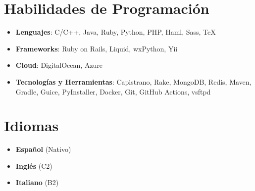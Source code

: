 \documentclass[letterpaper,11pt]{article}
\newcommand{\resumeSubHeadingListStart}{\begin{itemize}[leftmargin=*]}
\newcommand{\resumeSubHeadingListEnd}{\end{itemize}}
\begin{document}
\section{Habilidades de Programación}
  \resumeSubHeadingListStart
    \item{
      \textbf{Lenguajes}{: C/C++, Java, Ruby, Python, PHP, Haml, Sass, TeX}
    }
    \item{
      \textbf{Frameworks}{: Ruby on Rails, Liquid, wxPython, Yii}
    }
     \item{
    	\textbf{Cloud}{: DigitalOcean, Azure}
    }
    \item{
      \textbf{Tecnologías y Herramientas}{: Capistrano, Rake, MongoDB, Redis, Maven, Gradle, Guice, PyInstaller, Docker, Git, GitHub Actions, vsftpd}
    }
  \resumeSubHeadingListEnd

\section{Idiomas}
\resumeSubHeadingListStart
\item{
  \textbf{Español}{ (Nativo)}
}
\item{
  \textbf{Inglés}{ (C2)}
}
\item{
  \textbf{Italiano}{ (B2)}
}
\resumeSubHeadingListEnd

\end{document}
